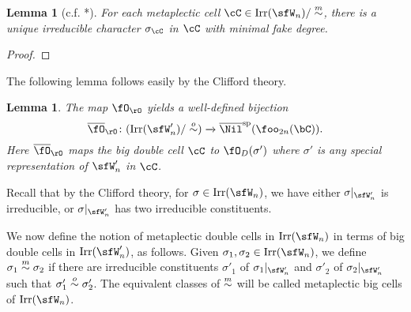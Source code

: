 \documentclass[12pt,a4paper]{amsart}
\numberwithin{equation}{section}
\newtheorem{lem}[thm]{Lemma}
\theoremstyle{remark}
\begin{document}
\begin{lem}[c.f. {\cite{BV2}*{}}]
  For each metaplectic cell $\cC \in \Irr(\sfW_{n})/\msim$, there is a unique
  irreducible character $\sigma_{\cC}$ in $\cC$ with minimal fake degree.
\end{lem}
\begin{proof}

\end{proof}


The following lemma follows easily by the Clifford theory.

\begin{lem}
 The map $\SpringerO$ yields a well-defined bijection
  \[
   \bSpringerO\colon  (\Irr(\sfW'_{n})/\osim )\xrightarrow{ } \bNilsp(\foo_{2n}(\bC)).
  \]
  Here $\bSpringerO$ maps the big double cell $\cC$ to $\SpringerD(\sigma')$
  where $\sigma'$ is any special representation of $\sfW'_{n}$ in $\cC$.
\end{lem}

Recall that by the Clifford theory, for $\sigma\in \Irr(\sfW_{n})$, we have
either $\sigma|_{\sfW'_{n}}$ is irreducible, or $\sigma|_{\sfW'_{n}}$ has two irreducible constituents.

We now define the notion of metaplectic double cells in $\Irr(\sfW_{n})$ in terms of
big double cells in $\Irr(\sfW'_{n})$, as follows. Given $\sigma_{1}, \sigma_{2}\in \Irr(\sfW_{n})$, we define $\sigma_{1}\stackrel{m}{\sim} \sigma_{2}$
if there are irreducible constituents $\sigma'_{1}$ of
$\sigma_{1}|_{\sfW'_{n}}$ and $\sigma'_{2}$ of $\sigma_{2}|_{\sfW'_{n}}$ such that $\sigma'_{1}\stackrel{o}{\sim} \sigma'_{2}$.
The equivalent classes of $\stackrel{m}{\sim}$ will be called metaplectic big cells of $\Irr(\sfW_{n})$.
\end{document}
